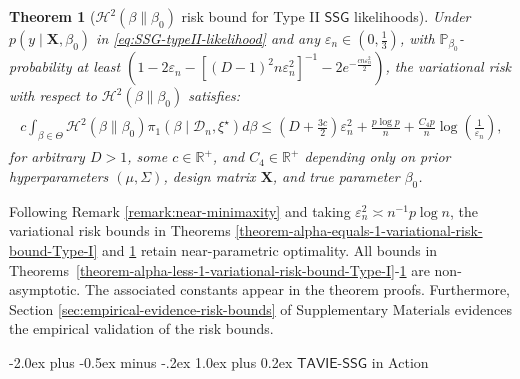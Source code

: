 \documentclass[12pt]{article}
\makeatletter
\def\section{\@startsection{section}{1}{\z@}
  {-2.0ex plus -0.5ex minus -.2ex} %
  {1.0ex plus 0.2ex}               %
  {\normalfont\Large\bfseries}}
\newtheorem{theorem}{Theorem}
\numberwithin{equation}{section}
\newcommand{\tssg}{\mathsf{TAVIE}\text{-}\mathsf{SSG}}
\makeatother
\begin{document}
\begin{theorem}[$\mathcal{H}^{2}(\beta \parallel \beta_0)$ risk bound for Type II $\mathsf{SSG}$ likelihoods]
\label{theorem-alpha-equals-1-variational-risk-bound-Type-II}
%
Under $p(y\mid \mathbf{X}, \beta_0)$ in \eqref{eq:SSG-typeII-likelihood} and any $\varepsilon_n \in \left(0, \frac{1}{3}\right)$, with $\mathbb{P}_{\beta_0}$-probability at least $(1 - 2\varepsilon_n - [(D-1)^2n\varepsilon_n^2]^{-1} - 2e^{-\tfrac{c n \varepsilon_n^2}{2}})$, the variational risk with respect to $\mathcal{H}^{2}(\beta \parallel \beta_0)$ satisfies:
%
\begin{align}\label{eq:type-2-risk-bound-alpha-1}
    \begin{split}
    c\int_{\beta\in \Theta}\mathcal{H}^{2}(\beta \parallel \beta_0)\pi_{1}(\beta\mid \mathcal{D}_n, \xi^{\star})d\beta
        \leq \left(D + \frac{3c}{2}\right)\varepsilon_n^2 + \frac{p\log p}{n} + \frac{C_4 p}{n}\log\left(\frac{1}{\varepsilon_n}\right),
    \end{split}
\end{align}
%
for arbitrary $D>1$, some $c \in \mathbb{R}^{+}$, and $C_4\in \mathbb{R}^{+}$ depending only on prior hyperparameters $(\mu, \Sigma)$, design matrix $\mathbf{X}$, and true parameter $\beta_0$.
\end{theorem}

Following Remark \ref{remark:near-minimaxity} and taking $\varepsilon_n^2 \asymp n^{-1} p\log n$, the variational risk bounds in Theorems \ref{theorem-alpha-equals-1-variational-risk-bound-Type-I} and \ref{theorem-alpha-equals-1-variational-risk-bound-Type-II} retain near-parametric optimality. All bounds in Theorems~\ref{theorem-alpha-less-1-variational-risk-bound-Type-I}-\ref{theorem-alpha-equals-1-variational-risk-bound-Type-II} are {non-asymptotic}. The associated constants appear in the theorem proofs. Furthermore, Section \ref{sec:empirical-evidence-risk-bounds} of Supplementary Materials evidences the empirical validation of the risk bounds.


\section{\texorpdfstring{$\tssg$}{TAVIE-SSG} in Action}\label{sec:TAVIE-SSG-applications}
\end{document}
